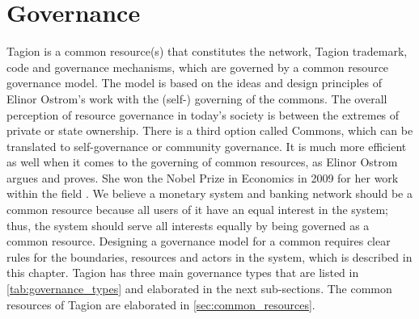 \section{Governance}
Tagion is a common resource(s) that constitutes the network, Tagion trademark, code and governance mechanisms, which are governed by a common resource governance model. The model is based on the ideas and design principles of Elinor Ostrom's work with the (self-) governing of the commons. The overall perception of resource governance in today's society is between the extremes of private or state ownership. There is a third option called Commons, which can be translated to self-governance or community governance. It is much more efficient as well when it comes to the governing of common resources, as Elinor Ostrom argues and proves. She won the Nobel Prize in Economics in 2009 for her work within the field \cite{ELINOR_OSTROM_NOBEL_LECTURE, 10.1257/aer.100.3.641}. We believe a monetary system and banking network should be a common resource because all users of it have an equal interest in the system; thus, the system should serve all interests equally by being governed as a common resource. Designing a governance model for a common requires clear rules for the boundaries, resources and actors in the system, which is described in this chapter. \cite{10.2139/ssrn.997834, ALLEN_CHRISTOPHER, ostrom2006}
\newline
Tagion has three main governance types that are listed in \cref{tab:governance_types} and elaborated in the next sub-sections. The common resources of Tagion are elaborated in \cref{sec:common_resources}.








